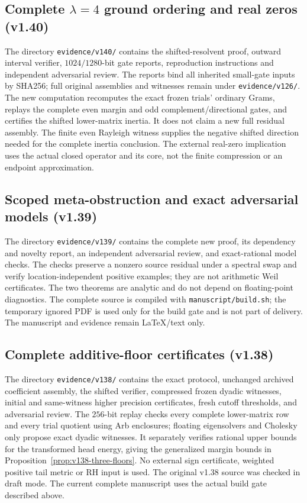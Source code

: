 \documentclass[11pt]{article}
\theoremstyle{remark}
\begin{document}
\subsection*{Complete $\lambda=4$ ground ordering and real zeros (v1.40)}
The directory \texttt{evidence/v140/} contains the shifted-resolvent
proof, outward interval verifier, $1024/1280$-bit gate reports,
reproduction instructions and independent adversarial review.
The reports bind all inherited small-gate inputs by SHA256; full
original assemblies and witnesses remain under \texttt{evidence/v126/}.
The new computation recomputes the exact frozen trials' ordinary Grams,
replays the complete even margin and odd complement/directional gates,
and certifies the shifted lower-matrix inertia. It does not claim a new
full residual assembly. The finite even Rayleigh witness supplies the
negative shifted direction needed for the complete inertia conclusion.
The external real-zero implication uses the actual closed operator and
its core, not the finite compression or an endpoint approximation.

\subsection*{Scoped meta-obstruction and exact adversarial models (v1.39)}
The directory \texttt{evidence/v139/} contains the complete new proof,
its dependency and novelty report, an independent adversarial review,
and exact-rational model checks. The checks preserve a nonzero source
residual under a spectral swap and verify location-independent positive
examples; they are not arithmetic Weil certificates. The two theorems
are analytic and do not depend on floating-point diagnostics.
The complete source is compiled with \texttt{manuscript/build.sh};
the temporary ignored PDF is used only for the build gate and is not
part of delivery. The manuscript and evidence remain LaTeX/text only.

\subsection*{Complete additive-floor certificates (v1.38)}
The directory \texttt{evidence/v138/} contains the exact protocol,
unchanged archived coefficient assembly, the shifted verifier,
compressed frozen dyadic witnesses, initial and same-witness higher
precision certificates, fresh cutoff thresholds, and adversarial review.
The $256$-bit replay checks every complete lower-matrix row and every
trial quotient using Arb enclosures; floating eigensolvers and Cholesky
only propose exact dyadic witnesses. It separately verifies rational
upper bounds for the transformed head energy, giving the generalized
margin bounds in Proposition~\ref{prop:v138-three-floors}. No external
sign certificate, weighted positive tail metric or RH input is used.
The original v1.38 source was checked in draft mode. The current
complete manuscript uses the actual build gate described above.
\end{document}
